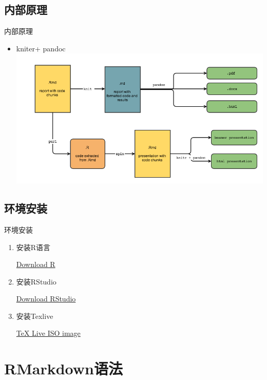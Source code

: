 \documentclass[10pt,ignorenonframetext,aspectratio=169,t,]{beamer} %
\providecommand{\tightlist}{%
  \setlength{\itemsep}{0pt}\setlength{\parskip}{0pt}}
\begin{document}
\subsection{内部原理}

\begin{frame}{内部原理}

\begin{itemize}
\tightlist
\item
  kniter+ pandoc \includegraphics{./figureFiles/knitr-workflow.png}
\end{itemize}

\end{frame}

\subsection{环境安装}

\begin{frame}{环境安装}

\begin{enumerate}
\def\labelenumi{\arabic{enumi}.}
\item
  安装R语言

  \href{https://www.r-project.org/}{Download R}
\item
  安装RStudio

  \href{https://www.rstudio.com/}{Download RStudio}
\item
  安装Texlive

  \href{http://tug.org/texlive/acquire-iso.html}{TeX Live ISO image}
\end{enumerate}

\end{frame}

\section{RMarkdown语法}\label{rmarkdown}
\end{document}
